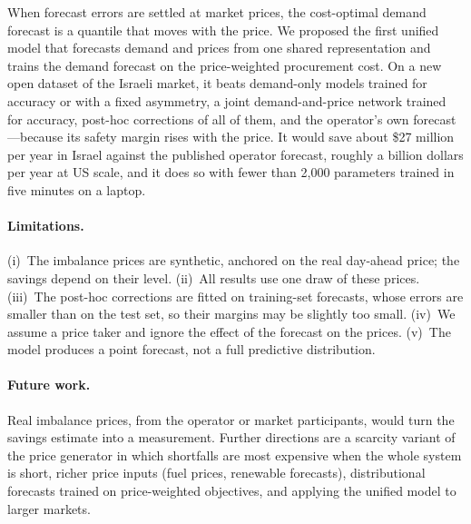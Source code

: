 When forecast errors are settled at market prices, the cost-optimal demand
forecast is a quantile that moves with the price.  We proposed the first
unified model that forecasts demand and prices from one shared representation
and trains the demand forecast on the price-weighted procurement cost.  On a
new open dataset of the Israeli market, it beats demand-only models trained for
accuracy or with a fixed asymmetry, a joint demand-and-price network trained
for accuracy, post-hoc corrections of all of them, and the operator's own
forecast---because its safety margin rises with the price.  It would save
about \$27 million per year in Israel against the published operator
forecast, roughly a billion dollars per year at US scale, and it does so with
fewer than 2{,}000 parameters trained in five minutes on a laptop.

\paragraph*{Limitations.}  (i)~The imbalance prices are synthetic, anchored on
the real day-ahead price; the savings depend on their level.  (ii)~All
results use one draw of these prices.  (iii)~The post-hoc corrections are
fitted on training-set forecasts, whose errors are smaller than on the test
set, so their margins may be slightly too small.  (iv)~We assume a price
taker and ignore the effect of the forecast on the prices.  (v)~The model
produces a point forecast, not a full predictive distribution.

\paragraph*{Future work.}  Real imbalance prices, from the operator or market
participants, would turn the savings estimate into a measurement.  Further
directions are a scarcity variant of the price generator in which shortfalls are most expensive when
the whole system is short, richer price inputs (fuel prices, renewable
forecasts), distributional forecasts trained on price-weighted objectives,
and applying the unified model to larger markets.
